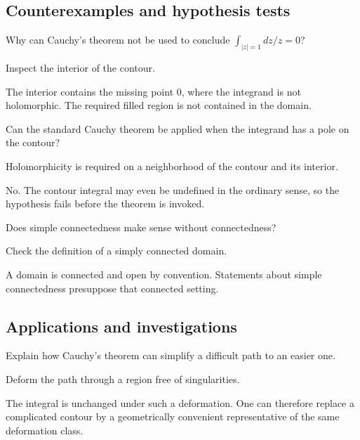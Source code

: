 \subsection*{Counterexamples and hypothesis tests}

\begin{exercise}\label{exr:iv05-expand-10}
Why can Cauchy's theorem not be used to conclude \(\int_{|z|=1}dz/z=0\)?
\end{exercise}
\begin{hint}
Inspect the interior of the contour.
\end{hint}
\begin{solution}
The interior contains the missing point \(0\), where the integrand is not holomorphic. The required filled region is not contained in the domain.
\end{solution}

\begin{exercise}\label{exr:iv05-expand-11}
Can the standard Cauchy theorem be applied when the integrand has a pole on the contour?
\end{exercise}
\begin{hint}
Holomorphicity is required on a neighborhood of the contour and its interior.
\end{hint}
\begin{solution}
No. The contour integral may even be undefined in the ordinary sense, so the hypothesis fails before the theorem is invoked.
\end{solution}

\begin{exercise}\label{exr:iv05-expand-12}
Does simple connectedness make sense without connectedness?
\end{exercise}
\begin{hint}
Check the definition of a simply connected domain.
\end{hint}
\begin{solution}
A domain is connected and open by convention. Statements about simple connectedness presuppose that connected setting.
\end{solution}

\subsection*{Applications and investigations}

\begin{exercise}\label{exr:iv05-expand-13}
Explain how Cauchy's theorem can simplify a difficult path to an easier one.
\end{exercise}
\begin{hint}
Deform the path through a region free of singularities.
\end{hint}
\begin{solution}
The integral is unchanged under such a deformation. One can therefore replace a complicated contour by a geometrically convenient representative of the same deformation class.
\end{solution}

